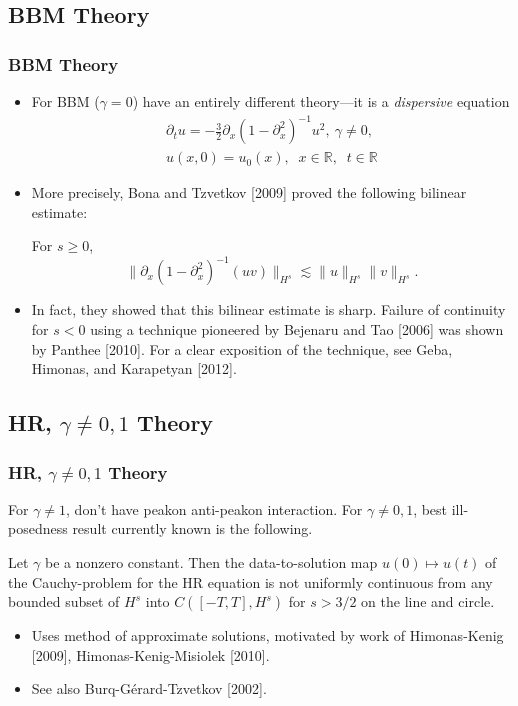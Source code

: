 \documentclass{beamer}
\numberwithin{equation}{section}
\newcommand{\rr}{\mathbb{R}}
\newcommand{\p}{\partial}
\begin{document}
\subsection{BBM Theory}
\begin{frame}
  \frametitle{BBM Theory}
  \begin{itemize}
    \item 
      For BBM ($\gamma = 0$) have an entirely different theory---it is a \emph{dispersive} equation
      \pause
     \begin{gather*}
 \p_t u = - 
 \frac{3}{2}\p_{x} (1 - \p_{x}^{2})^{-1} u^{2}, \ \gamma \neq 0,
\\
 u(x,0) = u_0(x), \; \; x \in \rr, \; \; t \in \rr
\end{gather*}
\pause
\item More precisely, Bona and Tzvetkov [2009] proved the following bilinear estimate:
  \begin{lemma}
    For $s \ge 0$, 
    \[ \| \p_{x}(1 - \p_{x}^{2})^{-1} (uv)\|_{H^{s}} \lesssim \| u \|_{H^{s}} \| v \|_{H^{s}}. \]
  \end{lemma}
  \pause
\item In fact, they showed that this bilinear estimate is sharp. Failure of continuity for $s < 0$ using a technique pioneered by Bejenaru and Tao [2006] was shown by Panthee [2010]. For a clear exposition of the technique, see Geba, Himonas, and Karapetyan [2012].
\end{itemize}
\end{frame}
\subsection{HR, $\gamma \neq 0,1$ Theory}
\begin{frame}
  \frametitle{HR, $\gamma \neq 0,1$ Theory}
  For $\gamma \neq 1$, don't have peakon anti-peakon interaction. For $\gamma \neq 0,1$, best ill-posedness result currently known is the following.
  \pause
\begin{theorem}
Let $\gamma$ be a nonzero constant. Then 
the data-to-solution map $u(0) \mapsto u(t)$ of the Cauchy-problem
for the HR equation
is not uniformly continuous
from any bounded subset of  $H^s$ into $C([-T, T], H^s)$
for $s>3/2$ on the line and circle.
%
\end{theorem}
\pause
\begin{itemize}
  \item
    Uses method of approximate solutions, motivated by work of Himonas-Kenig [2009], Himonas-Kenig-Misiolek [2010]. 
  \item 
See also Burq-G{\'e}rard-Tzvetkov [2002].
\end{itemize}
\end{frame}
\end{document}
